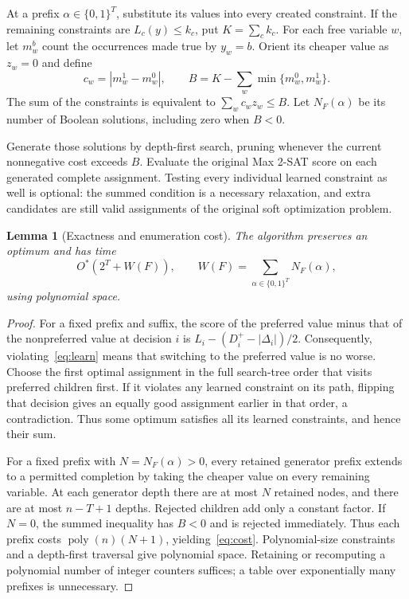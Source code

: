 \documentclass[11pt,a4paper]{article}
\newtheorem{lemma}[theorem]{Lemma}
\theoremstyle{remark}
\newcommand{\Ostar}{O^{*}}
\begin{document}
At a prefix $\alpha\in\{0,1\}^T$, substitute its values into every
created constraint. If the remaining constraints are $L_c(y)\le k_c$,
put $K=\sum_c k_c$. For each free variable $w$, let $m_w^b$ count the
occurrences made true by $y_w=b$. Orient its cheaper value as $z_w=0$ and
define
\begin{equation}
 c_w=|m_w^1-m_w^0|,\qquad
 B=K-\sum_w\min\{m_w^0,m_w^1\}.                    \label{eq:budget}
\end{equation}
The sum of the constraints is equivalent to
$\sum_w c_wz_w\le B$. Let $N_F(\alpha)$ be its number of Boolean
solutions, including zero when $B<0$.

Generate those solutions by depth-first search, pruning whenever the
current nonnegative cost exceeds $B$. Evaluate the original Max 2-SAT
score on each generated complete assignment. Testing every individual
learned constraint as well is optional: the summed condition is a
necessary relaxation, and extra candidates are still valid assignments
of the original soft optimization problem.

\begin{lemma}[Exactness and enumeration cost]\label{lem:cost}
The algorithm preserves an optimum and has time
\begin{equation}
 \Ostar\left(2^T+W(F)\right),\qquad
 W(F)=\sum_{\alpha\in\{0,1\}^T}N_F(\alpha),        \label{eq:cost}
\end{equation}
using polynomial space.
\end{lemma}
\begin{proof}
For a fixed prefix and suffix, the score of the preferred value minus
that of the nonpreferred value at decision $i$ is
$L_i-(D_i^+-|\Delta_i|)/2$. Consequently, violating~\eqref{eq:learn}
means that switching to the preferred value is no worse.
Choose the first optimal assignment in the full search-tree order that
visits preferred children first. If it violates any learned constraint
on its path, flipping that decision gives an equally good assignment
earlier in that order, a contradiction. Thus some optimum satisfies
all its learned constraints, and hence their sum.

For a fixed prefix with $N=N_F(\alpha)>0$, every retained generator
prefix extends to a permitted completion by taking the cheaper value
on every remaining variable. At each generator depth there are at most
$N$ retained nodes, and there are at most $n-T+1$ depths. Rejected
children add only a constant factor. If $N=0$, the summed inequality
has $B<0$ and is rejected immediately. Thus each prefix costs
$\operatorname{poly}(n)(N+1)$, yielding~\eqref{eq:cost}.
Polynomial-size constraints and a depth-first traversal give polynomial
space. Retaining or recomputing a polynomial number of integer counters
suffices; a table over exponentially many prefixes is unnecessary.
\end{proof}
\end{document}
